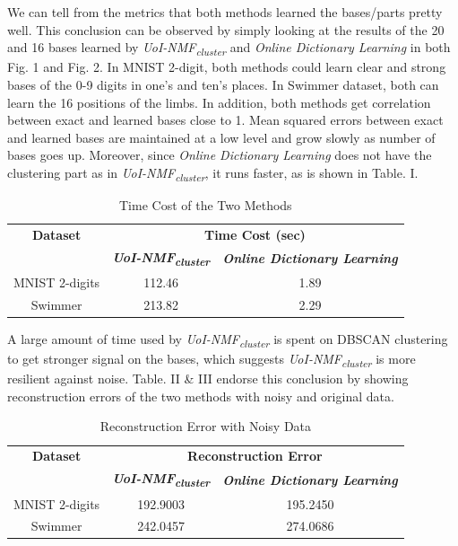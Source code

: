 \documentclass[conference]{IEEEtran}
\begin{document}
We can tell from the metrics that both methods learned the bases/parts pretty well. This conclusion can be observed by simply looking at the results of the 20 and 16 bases learned by \textit{UoI-NMF\textsubscript{cluster}} and \textit{Online Dictionary Learning} in both Fig. 1 and Fig. 2. In MNIST 2-digit, both methods could learn clear and strong bases of the 0-9 digits in one's and ten's places. In Swimmer dataset, both can learn the 16 positions of the limbs. In addition, both methods get correlation between exact and learned bases close to 1. Mean squared errors between exact and learned bases are maintained at a low level and grow slowly as number of bases goes up. Moreover, since \textit{Online Dictionary Learning} does not have the clustering part as in \textit{UoI-NMF\textsubscript{cluster}}, it runs faster, as is shown in Table. I. 

\begin{table}[htbp]
\caption{Time Cost of the Two Methods}
\begin{center}
\begin{tabular}{|c|c|c|}
\hline
\textbf{Dataset}&\multicolumn{2}{|c|}{\textbf{Time Cost (sec)}} \\
\cline{2-3} 
 & \textbf{\textit{UoI-NMF\textsubscript{cluster}}}& \textbf{\textit{Online Dictionary Learning}} \\
\hline
MNIST 2-digits & 112.46 & 1.89 \\
\hline
Swimmer & 213.82 & 2.29 \\
\hline
\end{tabular}
\label{tab1}
\end{center}
\end{table}

A large amount of time used by \textit{UoI-NMF\textsubscript{cluster}} is spent on DBSCAN\cite{b12} clustering to get stronger signal on the bases, which suggests \textit{UoI-NMF\textsubscript{cluster}} is more resilient against noise. Table. II \& III endorse this conclusion by showing reconstruction errors of the two methods with noisy and original data. 

\begin{table}[htbp]
\caption{Reconstruction Error with Noisy Data}
\begin{center}
\begin{tabular}{|c|c|c|}
\hline
\textbf{Dataset}&\multicolumn{2}{|c|}{\textbf{Reconstruction Error}} \\
\cline{2-3} 
 & \textbf{\textit{UoI-NMF\textsubscript{cluster}}}& \textbf{\textit{Online Dictionary Learning}} \\
\hline
MNIST 2-digits & 192.9003 & 195.2450 \\
\hline
Swimmer & 242.0457 & 274.0686 \\
\hline
\end{tabular}
\label{tab2}
\end{center}
\end{table}
\end{document}
